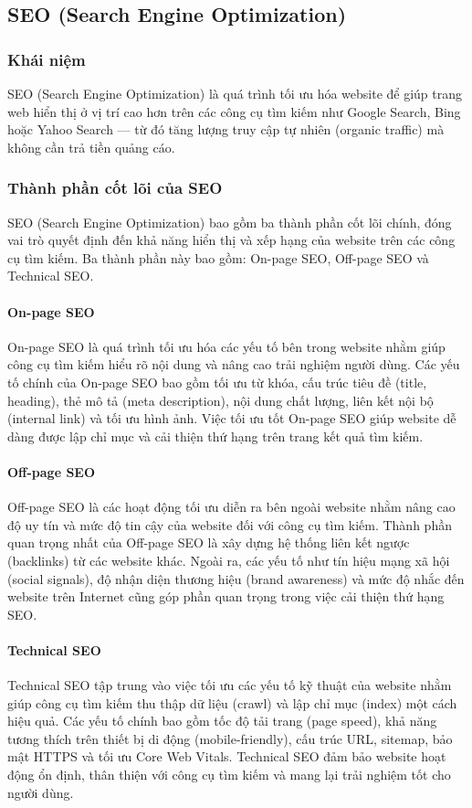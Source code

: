 \documentclass[13pt]{article}
\begin{document}
\subsection{SEO (Search Engine Optimization)}
\subsubsection{Khái niệm}
SEO (Search Engine Optimization) là quá trình tối ưu hóa website để giúp trang web hiển thị ở vị trí cao hơn trên các công cụ tìm kiếm như Google Search, Bing hoặc Yahoo Search — từ đó tăng lượng truy cập tự nhiên (organic traffic) mà không cần trả tiền quảng cáo.

\subsubsection{Thành phần cốt lõi của SEO}

SEO (Search Engine Optimization) bao gồm ba thành phần cốt lõi chính, đóng vai trò quyết định đến khả năng hiển thị và xếp hạng của website trên các công cụ tìm kiếm. Ba thành phần này bao gồm: On-page SEO, Off-page SEO và Technical SEO.

\paragraph{On-page SEO}
On-page SEO là quá trình tối ưu hóa các yếu tố bên trong website nhằm giúp công cụ tìm kiếm hiểu rõ nội dung và nâng cao trải nghiệm người dùng. Các yếu tố chính của On-page SEO bao gồm tối ưu từ khóa, cấu trúc tiêu đề (title, heading), thẻ mô tả (meta description), nội dung chất lượng, liên kết nội bộ (internal link) và tối ưu hình ảnh. Việc tối ưu tốt On-page SEO giúp website dễ dàng được lập chỉ mục và cải thiện thứ hạng trên trang kết quả tìm kiếm.

\paragraph{Off-page SEO}
Off-page SEO là các hoạt động tối ưu diễn ra bên ngoài website nhằm nâng cao độ uy tín và mức độ tin cậy của website đối với công cụ tìm kiếm. Thành phần quan trọng nhất của Off-page SEO là xây dựng hệ thống liên kết ngược (backlinks) từ các website khác. Ngoài ra, các yếu tố như tín hiệu mạng xã hội (social signals), độ nhận diện thương hiệu (brand awareness) và mức độ nhắc đến website trên Internet cũng góp phần quan trọng trong việc cải thiện thứ hạng SEO.

\paragraph{Technical SEO}
Technical SEO tập trung vào việc tối ưu các yếu tố kỹ thuật của website nhằm giúp công cụ tìm kiếm thu thập dữ liệu (crawl) và lập chỉ mục (index) một cách hiệu quả. Các yếu tố chính bao gồm tốc độ tải trang (page speed), khả năng tương thích trên thiết bị di động (mobile-friendly), cấu trúc URL, sitemap, bảo mật HTTPS và tối ưu Core Web Vitals. Technical SEO đảm bảo website hoạt động ổn định, thân thiện với công cụ tìm kiếm và mang lại trải nghiệm tốt cho người dùng.
\end{document}
